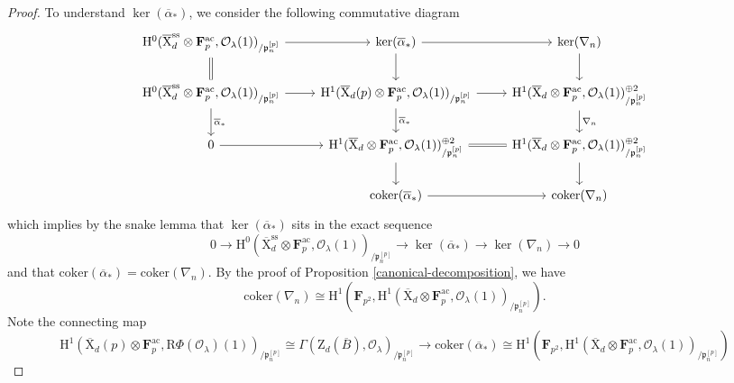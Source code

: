 \documentclass[10pt,a4paper]{amsart}
\def\FF{\mathbf{F}}
\def\ac{\mathrm{ac}}
\def\calO{\mathcal{O}}
\def\coker{\mathrm{coker}}
\def\frakp{\mathfrak{p}}
\def\rmH{\mathrm{H}}
\def\rmR{\mathrm{R}}
\def\rmX{\mathrm{X}}
\def\rmZ{\mathrm{Z}}
\def\ss{\mathrm{ss}}
\begin{document}
\begin{proof}
To understand $\ker(\overline{\alpha}_{\ast})$, we consider the following commutative diagram
\begin{equation}\label{dia2}
\begin{tikzcd}
\rmH^{0}(\overline{\rmX}^{\ss}_{d}\otimes{\FF^{\ac}_{p}}, \calO_{\lambda}(1))_{/\frakp^{[p]}_{n}}\arrow[r] \arrow[d, Rightarrow, no head] & \ker(\overline{\alpha}_{\ast}) \arrow[d] \arrow[r] & \ker(\nabla_{n}) \arrow[d] \\
\rmH^{0}(\overline{\rmX}^{\ss}_{d}\otimes{\FF^{\ac}_{p}}, \calO_{\lambda}(1))_{/\frakp^{[p]}_{n}} \arrow[r] \arrow[d, "\overline{\alpha}_{\ast}"] & \rmH^{1}(\overline{\rmX}_{d}(p)\otimes{\FF^{\ac}_{p}}, \calO_{\lambda}(1))_{/\frakp^{[p]}_{n}} \arrow[r] \arrow[d, "\overline{\alpha}_{\ast}"] & \rmH^{1}(\overline{\rmX}_{d}\otimes{\FF^{\ac}_{p}}, \calO_{\lambda}(1))^{\oplus 2}_{/\frakp^{[p]}_{n}} \arrow[d, "\nabla_{n}"] \\
0 \arrow[r]  & \rmH^{1}(\overline{\rmX}_{d}\otimes{\FF^{\ac}_{p}}, \calO_{\lambda}(1))^{\oplus 2}_{/\frakp^{[p]}_{n}} \arrow[r, Rightarrow, no head] \arrow[d] & \rmH^{1}(\overline{\rmX}_{d}\otimes{\FF^{\ac}_{p}}, \calO_{\lambda}(1))^{\oplus2}_{/\frakp^{[p]}_{n}} \arrow[d] \\
          & \coker(\overline{\alpha}_{\ast}) \arrow[r]           & \coker(\nabla_{n})     
\end{tikzcd}
\end{equation}
which implies by the snake lemma that $\ker(\overline{\alpha}_{\ast})$ sits in the exact sequence
\begin{equation}\label{ker-alpha}
0\rightarrow \rmH^{0}(\overline{\rmX}^{\ss}_{d}\otimes{\FF^{\ac}_{p}}, \calO_{\lambda}(1))_{/\frakp^{[p]}_{n}}\rightarrow \ker(\overline{\alpha}_{\ast})\rightarrow \ker(\nabla_{n})\rightarrow0
\end{equation}
and that $\coker(\overline{\alpha}_{\ast})=\coker(\nabla_{n})$. By the proof of Proposition \ref{canonical-decomposition}, we have 
\begin{equation*}
\coker(\nabla_{n})\cong\rmH^{1}(\FF_{p^{2}}, \rmH^{1}(\overline{\rmX}_{d}\otimes{\FF^{\ac}_{p}}, \calO_{\lambda}(1))_{/\frakp^{[p]}_{n}}). 
\end{equation*}
Note the connecting map  
\begin{equation*}
\rmH^{1}(\overline{\rmX}_{d}(p)\otimes{\FF^{\ac}_{p}}, \rmR\Phi(\calO_{\lambda})(1))_{/\frakp^{[p]}_{n}}\cong \Gamma(\rmZ_{d}(\overline{B}), \calO_{\lambda})_{/\frakp^{[p]}_{n}}\rightarrow \coker(\overline{\alpha}_{\ast})\cong \rmH^{1}(\FF_{p^{2}}, \rmH^{1}(\overline{\rmX}_{d}\otimes{\FF^{\ac}_{p}}, \calO_{\lambda}(1))_{/\frakp^{[p]}_{n}})

\end{equation*}
\end{proof}
\end{document}
